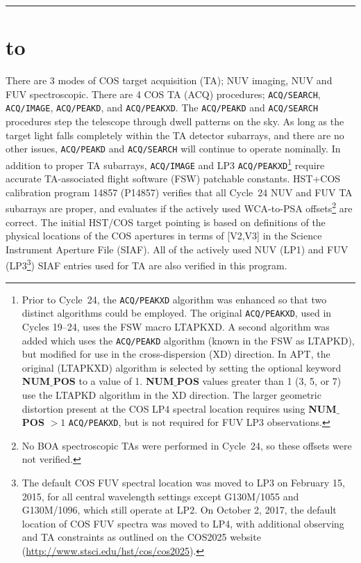 \documentclass[12pt]{reportj}
\newcommand{\pid}[1]{{\rm P}#1}
\newcommand{\fsw}[1]{\textsc{LTA#1}}
\newcommand{\tacq}[1]{\texttt{ACQ/#1}}
\def\numpos{{\bf NUM$\_$POS}\rm}
\def\ssection#1{\addtocounter{section}{1} \setcounter{subsection}{0} \section*{\hbox to \hsize{\large\bf \arabic{section}. #1\hfill }}}
\begin{document}
\vspace{-0.1cm}
\noindent\rule{\linewidth}{1.0pt}
\vspace{-1cm}
\vspace{0.8cm}
\clearpage
\ssection{Introduction}\label{sec:Introduction}
\vspace{-0.3cm}
There are 3 modes of COS target acquisition (TA); NUV imaging, NUV and FUV spectroscopic.
There are 4 COS TA (ACQ) procedures; \tacq{SEARCH}, \tacq{IMAGE}, \tacq{PEAKD}, and \tacq{PEAKXD}.
The \tacq{PEAKD} and \tacq{SEARCH} procedures step the telescope through dwell patterns on the sky. As long as the target light falls completely within the TA detector subarrays, and there are no other issues, \tacq{PEAKD} and \tacq{SEARCH} will continue to operate nominally.
In addition to proper TA subarrays, \tacq{IMAGE} and LP3 \tacq{PEAKXD}\footnote{Prior to Cycle~24, the \tacq{PEAKXD} algorithm was enhanced so that two distinct algorithms could be employed. The original \tacq{PEAKXD}, used in Cycles 19--24, uses the FSW macro \fsw{PKXD}. A second algorithm was added which uses the \tacq{PEAKD} algorithm (known in the FSW as \fsw{PKD}), but modified for use in the cross-dispersion (XD) direction. In APT, the original (\fsw{PKXD}) algorithm is selected by setting the optional keyword \numpos{} to a value of 1. \numpos{} values greater than 1 (3, 5, or 7) use the \fsw{PKD} algorithm in the XD direction.
The larger geometric distortion present at the COS LP4 spectral location requires using \numpos{} $ > 1$ \tacq{PEAKXD}, but is not required for FUV LP3 observations.} require accurate TA-associated flight software (FSW) patchable constants.
HST+COS calibration program 14857 (\pid{14857}) verifies that all Cycle~24 NUV and FUV TA subarrays are proper, and evaluates if the actively used WCA-to-PSA offsets\footnote{No BOA spectroscopic TAs were performed in Cycle~24, so these offsets were not verified.} are correct.
The initial HST/COS target pointing is based on definitions of the physical locations of the COS apertures in terms of [V2,V3] in the Science Instrument Aperture File (SIAF).
All of the actively used NUV (LP1) and FUV (LP3\footnote{The default COS FUV spectral location was moved to LP3 on February 15, 2015, for all central wavelength settings except G130M/1055 and G130M/1096, which still operate at LP2. On October 2, 2017, the default location of COS FUV spectra was moved to LP4, with additional observing and TA constraints as outlined on the COS2025 website (\url{http://www.stsci.edu/hst/cos/cos2025}).}) SIAF entries used for TA are also verified in this program.
\end{document}
